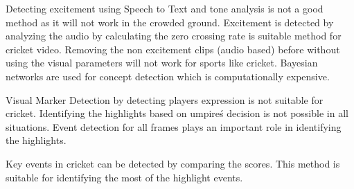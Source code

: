Detecting excitement using Speech to Text and tone analysis is not a good method as it will not work in the crowded ground. Excitement is detected by analyzing the audio by calculating the zero crossing rate is suitable method for cricket video.  Removing the non excitement clips (audio based) before without using the visual parameters will not work for sports like cricket. Bayesian networks are used for concept detection which is computationally expensive.

Visual Marker Detection by detecting player\textquotesingle s expression is not suitable for cricket. Identifying the highlights based on umpire\'s decision is not possible in all situations. Event detection for all frames plays an important role in identifying the highlights.

Key events in cricket can be detected by comparing the scores. This method is suitable for identifying the most of the highlight events.

